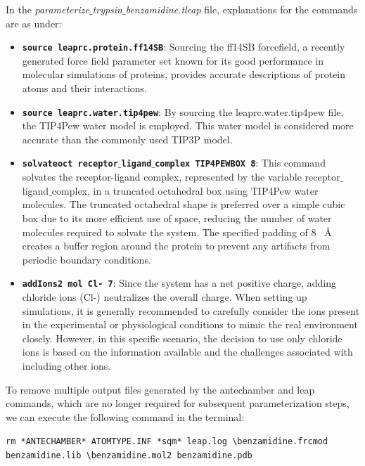 \documentclass[9pt,training,pubversion]{livecoms}
\begin{document}
\noindent In the \textit{parameterize$\_$trypsin$\_$benzamidine.tleap} file, explanations for the commands are as under: 
\begin{itemize}
\item \texttt{\textbf{source leaprc.protein.ff14SB}}: Sourcing the ff14SB forcefield, a recently generated force field parameter set known for its good performance in molecular simulations of proteins, provides accurate descriptions of protein atoms and their interactions.
\item \texttt{\textbf{source leaprc.water.tip4pew}}: By sourcing the leaprc.water.tip4pew file, the TIP4Pew water model is employed. This water model is considered more accurate than the commonly used TIP3P model.
\item \texttt{\textbf{solvateoct receptor$\_$ligand$\_$complex TIP4PEWBOX 8}}: This command solvates the receptor-ligand complex, represented by the variable receptor$\_$ligand$\_$complex, in a truncated octahedral box using TIP4Pew water molecules. The truncated octahedral shape is preferred over a simple cubic box due to its more efficient use of space, reducing the number of water molecules required to solvate the system. The specified padding of 8 \SI{}{\angstrom} creates a buffer region around the protein to prevent any artifacts from periodic boundary conditions.
\item \texttt{\textbf{addIons2 mol Cl- 7}}: Since the system has a net positive charge, adding chloride ions (Cl-) neutralizes the overall charge. When setting up simulations, it is generally recommended to carefully consider the ions present in the experimental or physiological conditions to mimic the real environment closely. However, in this specific scenario, the decision to use only chloride ions is based on the information available and the challenges associated with including other ions.
\end{itemize}

\noindent To remove multiple output files generated by the antechamber and leap commands, which are no longer required for subsequent parameterization steps, we can execute the following command in the terminal:

\begin{tcolorbox}[colback=black!8!white, colframe=black!50!black, fontlower=\tiny, left=2pt, right=2pt, top=2pt, bottom=2pt] 
\texttt{rm *ANTECHAMBER* ATOMTYPE.INF *sqm* leap.log \textbackslash \linebreak benzamidine.frcmod benzamidine.lib \textbackslash \linebreak benzamidine.mol2 benzamidine.pdb}
\end{tcolorbox}
\end{document}

